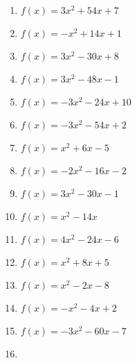 \documentclass{article}%
\begin{document}
\begin{enumerate}[label=\alph*)]
\item%
\newline\vspace{0.5cm} $f(x)=3x^2 + 54x + 7$%
\item%
\newline\vspace{0.5cm} $f(x)=-x^2 + 14x + 1$%
\item%
\newline\vspace{0.5cm} $f(x)=3x^2 - 30x + 8$%
\item%
\newline\vspace{0.5cm} $f(x)=3x^2 - 48x - 1$%
\item%
\newline\vspace{0.5cm} $f(x)=-3x^2 - 24x + 10$%
\item%
\newline\vspace{0.5cm} $f(x)=-3x^2 - 54x + 2$%
\item%
\newline\vspace{0.5cm} $f(x)=x^2 + 6x - 5$%
\item%
\newline\vspace{0.5cm} $f(x)=-2x^2 - 16x - 2$%
\item%
\newline\vspace{0.5cm} $f(x)=3x^2 - 30x - 1$%
\item%
\newline\vspace{0.5cm} $f(x)=x^2 - 14x$%
\item%
\newline\vspace{0.5cm} $f(x)=4x^2 - 24x - 6$%
\item%
\newline\vspace{0.5cm} $f(x)=x^2 + 8x + 5$%
\item%
\newline\vspace{0.5cm} $f(x)=x^2 - 2x - 8$%
\item%
\newline\vspace{0.5cm} $f(x)=-x^2 - 4x + 2$%
\item%
\newline\vspace{0.5cm} $f(x)=-3x^2 - 60x - 7$%
\item%

\end{enumerate}
\end{document}
